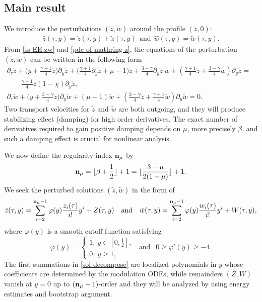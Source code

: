 \documentclass{article}
\newcommand{\ga}{\gamma}
\newcommand{\pa}{\partial}
\def\be{\begin{equation}}
\def\ee{\end{equation}}
\def\ndmu{{\bf{n}_{\mu}}}
\numberwithin{equation}{section}
\begin{document}
\subsection{Main result} 

We introduce the perturbations $(\tilde z, \tilde w)$ around the profile $(\mathring z, 0)$: 
\be
	\begin{aligned}
		\hat z(\tau,y) = \mathring z(\tau, y) + \tilde z(\tau, y) \ \ \text{and} \ \  \hat w(\tau,y) =\tilde w(\tau, y).
	\end{aligned}
\ee
From \eqref{ss EE zw} and \eqref{pde of mathring z}, the equations of the perturbation $(\tilde z, \tilde w)$ can be written in the following form 
\be\label{PDE of tilde z w}
	\begin{aligned}
		\partial_\tau \tilde z + \Big(y+\frac{\ga+1}{4}\mathring z \Big) \partial_y \tilde z + \Big(\frac{\ga+1}{4}\partial_y \mathring z +\mu-1\Big)\tilde z +\frac{3-\ga}{4}\partial_y \mathring z \ \tilde w +(\frac{\ga+1}{4}\tilde z+\frac{3-\ga}{4}\tilde w)\partial_y \tilde z=& \\ \qquad \frac{\ga+1}{4} \bar z (1-\chi) \pa_y \mathring z ,&\\
		\partial_\tau \tilde w + \Big(y+\frac{3-\ga}{4}\mathring z \Big) \partial_y \tilde w + (\mu-1)\tilde w +(\frac{3-\ga}{4}\tilde z+\frac{\ga+1}{4}\tilde w)\partial_y \tilde w= 0.&
	\end{aligned}
\ee
Two transport velocities for $\tilde z$ and $\tilde w$ are both outgoing, and they will produce stabilizing effect (damping) for high order derivatives.  
The exact number of derivatives required to gain positive damping depends on $\mu$, more precisely $\beta$, and such a damping effect is crucial for nonlinear analysis. 

We now define the regularity index $\ndmu$ by 
\be\label{def ndmu}
        \ndmu = \lfloor  \beta + \frac12  \rfloor+1  = \lfloor \frac{3-\mu}{2(1-\mu)} \rfloor +1 .
\ee
We seek the perturbed solutions $(\tilde z, \tilde w)$ in the form of  
\be\label{sol decompose}
	\tilde z(\tau,y) = \sum_{i=2}^{\ndmu-1} \varphi(y) \frac{z_i(\tau)}{i!}y^i + Z(\tau,y) \ \ \text{ and } \ \   \tilde w(\tau,y) = \sum_{i=2}^{\ndmu-1} \varphi(y) \frac{w_i(\tau)}{i!}y^i + W(\tau,y), 
\ee
where  
$  \varphi(y) $ is a smooth cutoff function satisfying  
\be
   \varphi(y) = \begin{cases}
        1,\ y\in[0,\frac12],\\
        0,\ y\geq 1,
    \end{cases}\ \text{ and }\ \ 0\geq \varphi'(y) \geq -4.
\ee
The first summations in \eqref{sol decompose} are localized polynomials in $y$ whose coefficients are determined by the modulation ODEs, while remainders $(Z,W)$ vanish at $y=0$ up to $(\ndmu-1)$-order and they will be analyzed by using energy estimates and bootstrap argument. 
\end{document}
